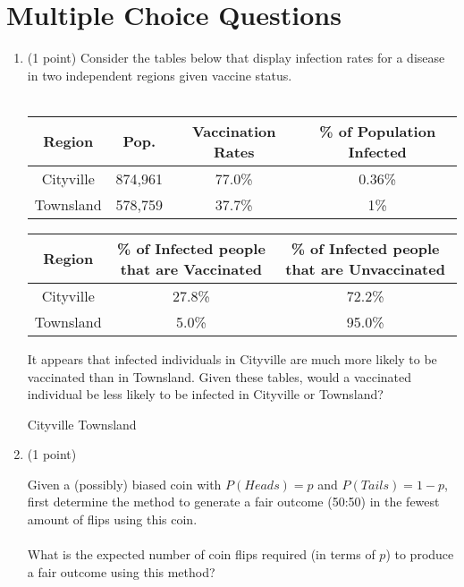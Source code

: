 
\section{Multiple Choice Questions}
\begin{enumerate}[start]

\item (1 point) Consider the tables below that display infection rates for a disease in two independent regions given vaccine status.
%
\\\\
\begin{tabular}{ |c|c|c|c| } 
	\hline
	Region & Pop. & Vaccination Rates & \% of Population Infected \\
	\hline
	Cityville & 874,961 & 77.0\% & 0.36\% \\ 
	\hline
	Townsland & 578,759 & 37.7\% &  1\%\\ 
	\hline
\end{tabular}

\vspace{0.5cm}

\begin{tabular}{ |c|c|c| } 
	\hline
	Region & \% of Infected people that are Vaccinated & \% of Infected people that are Unvaccinated\\
	\hline
	Cityville & 27.8\% & 72.2\%  \\ 
	\hline
	Townsland & 5.0\% & 95.0\%\\ 
	\hline
\end{tabular}

It appears that infected individuals in Cityville are much more likely to be vaccinated than in Townsland. Given these tables, would a vaccinated individual be less likely to be infected in Cityville or Townsland?


\begin{oneparcheckboxes}
\choice Cityville
\choice Townsland
\end{oneparcheckboxes}




\item (1 point)

Given a (possibly) biased coin with $P(Heads) = p$ and $P(Tails) = 1 - p$, first determine the method to generate a fair outcome (50:50) in the fewest amount of flips using this coin.
\\\\
What is the expected number of coin flips required (in terms of $p$) to produce a fair outcome using this method?


\end{enumerate}
